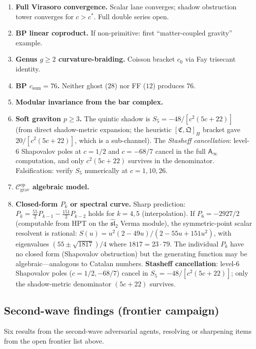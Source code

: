 \documentclass[11pt]{article}
\newcommand{\cC}{\mathcal{C}}
\newcommand{\Ainf}{\mathsf{A}_{\infty}}
\begin{document}
\begin{enumerate}
\item \textbf{Full Virasoro convergence.}  Scalar lane converges;
  shadow obstruction tower converges for $c > c^*$.  Full double series open.
\item \textbf{BP linear coproduct.}  If non-primitive: first
  ``matter-coupled gravity'' example.
\item \textbf{Genus $g \ge 2$ curvature-braiding.}  Coisson
  bracket $c_0$ via Fay trisecant identity.
\item \textbf{BP $c_{\mathrm{sum}} = 76$.}  Neither ghost ($28$)
  nor FF ($12$) produces $76$.
\item \textbf{Modular invariance from the bar complex.}
\item \textbf{Soft graviton $p \ge 3$.}  The quintic shadow
  is $S_5 = -48/[c^2(5c+22)]$ (from direct shadow-metric
  expansion; the heuristic $[\mathfrak{C},\mathfrak{Q}]_H$
  bracket gave $20/[c^2(5c+22)]$, which is a sub-channel).
  The \emph{Stasheff cancellation}: level-$6$ Shapovalov
  poles at $c = 1/2$ and $c = -68/7$ cancel in the full
  $\Ainf$ computation, and only $c^2(5c+22)$ survives in
  the denominator.  Falsification: verify $S_5$ numerically
  at $c = 1, 10, 26$.
\item \textbf{$\cC_{\mathrm{grav}}^{\mathrm{op}}$ algebraic model.}
\item \textbf{Closed-form $P_k$ or spectral curve.}  Sharp
  prediction: $P_k = \tfrac{55}{2}P_{k-1} - \tfrac{151}{2}P_{k-2}$
  holds for $k = 4,5$ (interpolation).  If $P_6 = -2927/2$
  (computable from HPT on the $\widehat{\mathfrak{sl}}_2$ Verma
  module), the symmetric-point scalar resolvent is rational:
  $S(u) = u^2(2-49u)/(2-55u+151u^2)$, with eigenvalues
  $(55 \pm \sqrt{1817})/4$ where $1817 = 23 \cdot 79$.  The
  individual $P_k$ have no closed form (Shapovalov obstruction) but
  the generating function may be algebraic---analogous to Catalan
  numbers.  \textbf{Stasheff cancellation}: level-$6$ Shapovalov
  poles ($c = 1/2, -68/7$) cancel in $S_5 = -48/[c^2(5c+22)]$;
  only the shadow-metric denominator $(5c+22)$ survives.
\end{enumerate}

\subsection{Second-wave findings (frontier campaign)}
\label{subsec:polyakov-second-wave}

Six results from the second-wave adversarial agents, resolving or
sharpening items from the open frontier list above.
\end{document}
